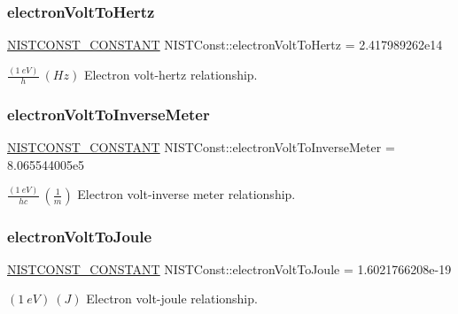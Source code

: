 \subsubsection{\texorpdfstring{electron\+Volt\+To\+Hertz}{electronVoltToHertz}}
{\footnotesize\ttfamily \mbox{\hyperlink{_n_i_s_t_const_8hpp_a2b0fc1d7452373f816175dd86ce26729}{N\+I\+S\+T\+C\+O\+N\+S\+T\+\_\+\+C\+O\+N\+S\+T\+A\+NT}} N\+I\+S\+T\+Const\+::electron\+Volt\+To\+Hertz = 2.\+417989262e14}

$\frac{(1\ eV)}{h} \ (Hz)$ Electron volt-\/hertz relationship. \mbox{\label{group___n_i_s_t_const-_electron_volt_ga333e07ed95192173791fcf53673f79ef}} 
\subsubsection{\texorpdfstring{electron\+Volt\+To\+Inverse\+Meter}{electronVoltToInverseMeter}}
{\footnotesize\ttfamily \mbox{\hyperlink{_n_i_s_t_const_8hpp_a2b0fc1d7452373f816175dd86ce26729}{N\+I\+S\+T\+C\+O\+N\+S\+T\+\_\+\+C\+O\+N\+S\+T\+A\+NT}} N\+I\+S\+T\+Const\+::electron\+Volt\+To\+Inverse\+Meter = 8.\+065544005e5}

$\frac{(1\ eV)}{hc} \ (\frac{1}{m})$ Electron volt-\/inverse meter relationship. \mbox{\label{group___n_i_s_t_const-_electron_volt_ga214ec0b05df4113393bd1d3e631aebe6}} 
\subsubsection{\texorpdfstring{electron\+Volt\+To\+Joule}{electronVoltToJoule}}
{\footnotesize\ttfamily \mbox{\hyperlink{_n_i_s_t_const_8hpp_a2b0fc1d7452373f816175dd86ce26729}{N\+I\+S\+T\+C\+O\+N\+S\+T\+\_\+\+C\+O\+N\+S\+T\+A\+NT}} N\+I\+S\+T\+Const\+::electron\+Volt\+To\+Joule = 1.\+6021766208e-\/19}

$(1\ eV) \ (J)$ Electron volt-\/joule relationship. \mbox{\label{group___n_i_s_t_const-_electron_volt_gaaac3cf941012add952f4aee0c72f0a42}} 
